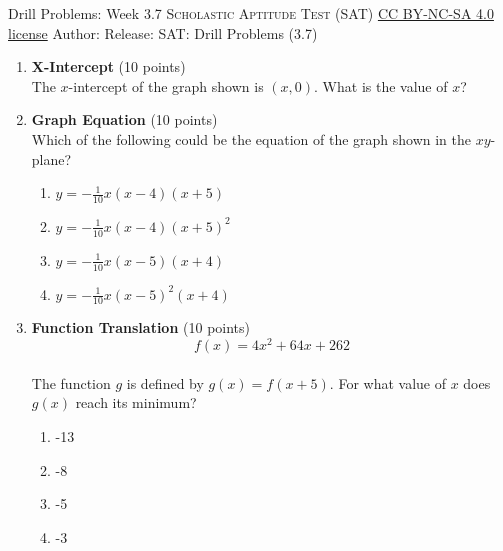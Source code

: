 \newpage\handout
{Drill Problems: Week 3.7}
{\textsc{Scholastic Aptitude Test (SAT)}}
{\href{https://creativecommons.org/licenses/by-nc-sa/4.0/}{CC BY-NC-SA 4.0 license}}
{Author: \BookAuthor}{Release: \generatedOn}
{SAT: Drill Problems (3.7)}


\begin{enumerate}
  \item \textbf{X-Intercept} (10 points)\\
  The $x$-intercept of the graph shown is $(x, 0)$. What is the value of $x$?
  \begin{subanswer}
  \end{subanswer}
  

  \newpage


  \item \textbf{Graph Equation} (10 points)\\
  Which of the following could be the equation of the graph shown in the $xy$-plane?
  \begin{enumerate}[label=(\Alph*)]
    \item $y=-\frac{1}{10} x(x-4)(x+5)$
    \item $y=-\frac{1}{10} x(x-4)(x+5)^{2}$
    \item $y=-\frac{1}{10} x(x-5)(x+4)$
    \item $y=-\frac{1}{10} x (x-5)^{2}(x+4)$
  \end{enumerate}
  \begin{subanswer}
  \end{subanswer}


  \item \textbf{Function Translation} (10 points)\\
  $$f(x)=4 x^{2}+64 x+262$$\\
  The function $g$ is defined by $g(x)=f(x+5)$. For what value of $x$ does $g(x)$ reach its minimum?
  \begin{enumerate}[label=(\Alph*)]
    \item -13
    \item -8
    \item -5
    \item -3
  \end{enumerate}
  \begin{subanswer}
  \end{subanswer}



\end{enumerate}
